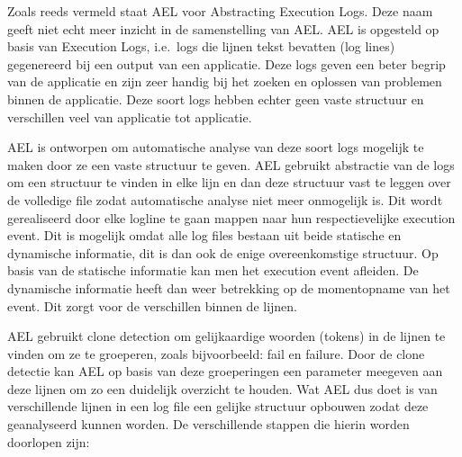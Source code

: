 Zoals reeds vermeld staat AEL voor Abstracting Execution Logs. Deze naam geeft niet echt meer inzicht in de samenstelling van AEL. AEL is opgesteld op basis van Execution Logs, i.e.\ logs die lijnen tekst bevatten (log lines) gegenereerd bij een output van een applicatie. Deze logs geven een beter begrip van de applicatie en zijn zeer handig bij het zoeken en oplossen van problemen binnen de applicatie. Deze soort logs hebben echter geen vaste structuur en verschillen veel van applicatie tot applicatie.

AEL is ontworpen om automatische analyse van deze soort logs mogelijk te maken door ze een vaste structuur te geven. AEL gebruikt abstractie van de logs om een structuur te vinden in elke lijn en dan deze structuur vast te leggen over de volledige file zodat automatische analyse niet meer onmogelijk is. Dit wordt gerealiseerd door elke logline te gaan mappen naar hun respectievelijke execution event. Dit is mogelijk omdat alle log files bestaan uit beide statische en dynamische informatie, dit is dan ook de enige overeenkomstige structuur. Op basis van de statische informatie kan men het execution event afleiden. De dynamische informatie heeft dan weer betrekking op de momentopname van het event. Dit zorgt voor de verschillen binnen de lijnen. 

AEL gebruikt clone detection om gelijkaardige woorden (tokens) in de lijnen te vinden om ze te groeperen, zoals bijvoorbeeld: fail en failure. Door de clone detectie kan AEL op basis van deze groeperingen een parameter meegeven aan deze lijnen om zo een duidelijk overzicht te houden. Wat AEL dus doet is van verschillende lijnen in een log file een gelijke structuur opbouwen zodat deze geanalyseerd kunnen worden. De verschillende stappen die hierin worden doorlopen zijn:

